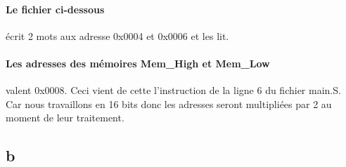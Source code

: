 \documentclass[a4paper]{article} %
\begin{document}
\paragraph{Le fichier ci-dessous} écrit 2 mots aux adresse 0x0004 et 0x0006 et les lit.


\paragraph{Les adresses des mémoires Mem\_High et Mem\_Low} valent 0x0008. Ceci vient de cette l'instruction de la ligne 6 du fichier main.S. Car nous travaillons en 16 bits donc les adresses seront multipliées par 2 au moment de leur traitement.
\begin{figure}[H]
    \centering
 \label{chrono_et1}
\end{figure}


\subsection{b}

\end{document}
